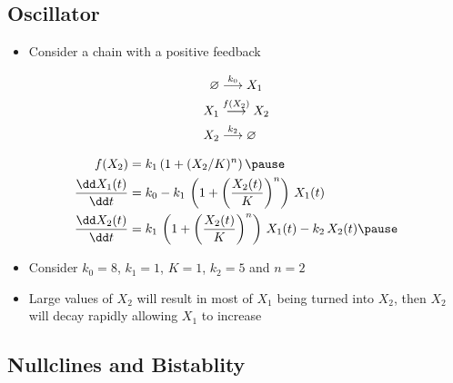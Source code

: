 \begin{slide}
\section[-2]{Oscillator}

\begin{PauseHighLight}
  \begin{itemize}
  \item Consider a chain with a positive feedback
  \end{itemize}
\begin{minipage}[t]{0.28\linewidth}
  \begin{align*}
    \varnothing &\stackrel{k_0}{\longrightarrow} X_1 \\
    X_1 &\stackrel{f(X_2)}{\longrightarrow} X_2 \\
    X_2 &\stackrel{k_2}{\longrightarrow} \varnothing
  \end{align*}
\end{minipage}\hfil
\begin{minipage}[t]{0.68\linewidth}
  {\small \begin{align*}
    f(X_2) &= k_1\left(1+ (X_2/K)^n\right)\pause\\
    \frac{\dd X_1(t)}{\dd t} &= k_0 -
       k_1\,\left(1+\left(\frac{X_2(t)}{K}\right)^n\right)\,X_1(t) \\
    \frac{\dd X_2(t)}{\dd t} &=
       k_1\,\left(1+\left(\frac{X_2(t)}{K}\right)^n\right)\,X_1(t) -k_2\,X_2(t)\pause
  \end{align*}}
\end{minipage}
\begin{itemize}
\item Consider $k_0=8$, $k_1=1$, $K=1$, $k_2=5$ and $n=2$\pause
\item Large values of $X_2$ will result in most of $X_1$ being turned
  into $X_2$, then $X_2$ will decay rapidly allowing $X_1$ to increase\pause
\end{itemize}
\end{PauseHighLight}

\end{slide}

\begin{slide}
\section[-2]{Nullclines and Bistablity}

\pause
\pb {}
\begin{center}
  \pause
\end{center}
\end{slide}

